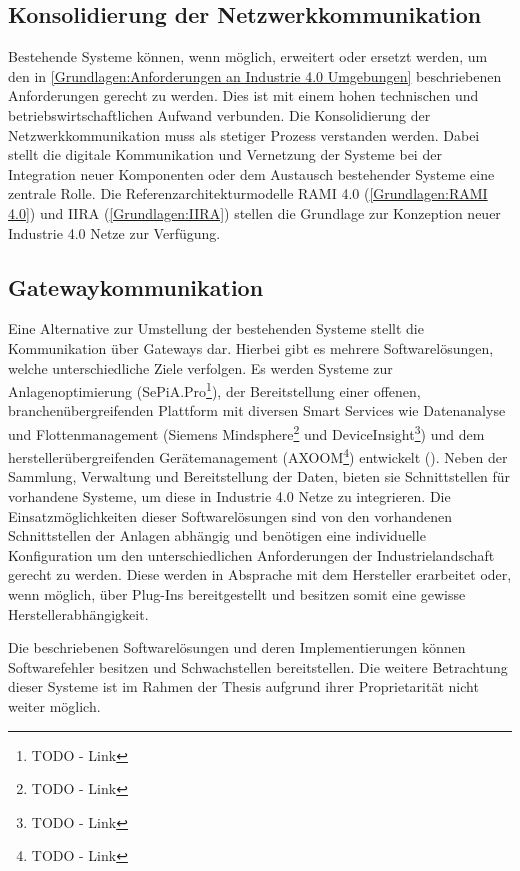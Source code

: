 \subsection{Konsolidierung der Netzwerkkommunikation}
Bestehende Systeme können, wenn möglich, erweitert oder ersetzt werden, um den in \autoref{Grundlagen:Anforderungen an Industrie 4.0 Umgebungen} beschriebenen Anforderungen gerecht zu werden. Dies ist mit einem hohen technischen und betriebswirtschaftlichen Aufwand verbunden. Die Konsolidierung der Netzwerkkommunikation muss als stetiger Prozess verstanden werden. Dabei stellt die digitale Kommunikation und Vernetzung der Systeme bei der Integration neuer Komponenten oder dem Austausch bestehender Systeme eine zentrale Rolle. Die Referenzarchitekturmodelle \ac{RAMI 4.0} (\autoref{Grundlagen:RAMI 4.0}) und \ac{IIRA} (\autoref{Grundlagen:IIRA}) stellen die Grundlage zur Konzeption neuer Industrie 4.0 Netze zur Verfügung.

\subsection{Gatewaykommunikation}
\label{Analyse:Gatewaykommunikation}
Eine Alternative zur Umstellung der bestehenden Systeme stellt die Kommunikation über Gateways dar. Hierbei gibt es mehrere Softwarelösungen, welche unterschiedliche Ziele verfolgen. Es werden Systeme zur Anlagenoptimierung (SePiA.Pro\footnote{TODO - Link}), der Bereitstellung einer offenen, branchenübergreifenden Plattform mit diversen Smart Services wie Datenanalyse und Flottenmanagement (Siemens Mindsphere\footnote{TODO - Link} und DeviceInsight\footnote{TODO - Link}) und dem herstellerübergreifenden Gerätemanagement (AXOOM\footnote{TODO - Link}) entwickelt (\cite{acatec2016}). Neben der Sammlung, Verwaltung und Bereitstellung der Daten, bieten sie Schnittstellen für vorhandene Systeme, um diese in Industrie 4.0 Netze zu integrieren. Die Einsatzmöglichkeiten dieser Softwarelösungen sind von den vorhandenen Schnittstellen der Anlagen abhängig und benötigen eine individuelle Konfiguration um den unterschiedlichen Anforderungen der Industrielandschaft gerecht zu werden. Diese werden in Absprache mit dem Hersteller erarbeitet oder, wenn möglich, über Plug-Ins bereitgestellt und besitzen somit eine gewisse Herstellerabhängigkeit.

Die beschriebenen Softwarelösungen und deren Implementierungen können Softwarefehler besitzen und Schwachstellen bereitstellen. Die weitere Betrachtung dieser Systeme ist im Rahmen der Thesis aufgrund ihrer Proprietarität nicht weiter möglich.

